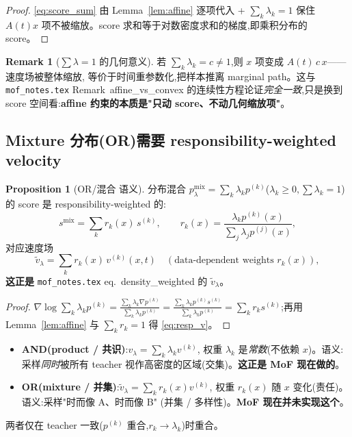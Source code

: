 \documentclass[11pt,a4paper]{article}
\newcommand{\resp}{r}
\theoremstyle{definition}
\newtheorem{remark}{Remark}
\newtheorem{proposition}{Proposition}
\begin{document}
\begin{proof}
\eqref{eq:score_sum} 由 Lemma~\ref{lem:affine} 逐项代入 + $\sum_k\lambda_k=1$
保住 $A(t)x$ 项不被缩放。score 求和等于对数密度求和的梯度,即乘积分布的 score。
\end{proof}

\begin{remark}[$\sum\lambda=1$ 的几何意义]
若 $\sum_k\lambda_k=c\neq 1$,则 $x$ 项变成 $A(t)\,c\,x$——速度场被整体缩放,
等价于时间重参数化,把样本推离 marginal path。这与 \texttt{mof\_notes.tex}
Remark~affine\_vs\_convex 的连续性方程论证\emph{完全一致},只是换到 score
空间看:\textbf{affine 约束的本质是"只动 score、不动几何缩放项"}。
\end{remark}

\subsection{Mixture 分布(OR)需要 responsibility-weighted velocity}
\label{ssec:or}

\begin{proposition}[OR/混合 语义]
\label{prop:mixture}
分布混合 $p_\lambda^{\text{mix}}=\sum_k\lambda_k p^{(k)}$($\lambda_k\ge 0,
\sum\lambda_k=1$)的 score 是 responsibility-weighted 的:
\begin{equation}
s^{\text{mix}}=\sum_k \resp_k(x)\,s^{(k)},\qquad
\resp_k(x)=\frac{\lambda_k p^{(k)}(x)}{\sum_j\lambda_j p^{(j)}(x)},
\end{equation}
对应速度场
\begin{equation}
\tilde v_\lambda=\sum_k \resp_k(x)\,v^{(k)}(x,t)
\quad(\text{data-dependent weights } \resp_k(x)),
\label{eq:resp_v}
\end{equation}
\textbf{这正是} \texttt{mof\_notes.tex} eq.~density\_weighted 的 $\tilde v_\lambda$。
\end{proposition}

\begin{proof}
$\nabla\log\sum_k\lambda_k p^{(k)}=\frac{\sum_k\lambda_k\nabla p^{(k)}}
{\sum_k\lambda_k p^{(k)}}=\frac{\sum_k\lambda_k p^{(k)}s^{(k)}}
{\sum_k\lambda_k p^{(k)}}=\sum_k \resp_k s^{(k)}$;再用 Lemma~\ref{lem:affine}
与 $\sum_k \resp_k=1$ 得 \eqref{eq:resp_v}。
\end{proof}

\begin{tcolorbox}[colback=blue!5,colframe=blue!50!black,title=\textbf{核心对照：常权 vs 责任权}]
\begin{itemize}[leftmargin=1.4em]
\item \textbf{AND(product / 共识)}:$v_\lambda=\sum_k\lambda_k v^{(k)}$,
权重 $\lambda_k$ 是\emph{常数}(不依赖 $x$)。语义:采样\emph{同时}被所有
teacher 视作高密度的区域(交集)。\textbf{这正是 MoF 现在做的}。
\item \textbf{OR(mixture / 并集)}:$\tilde v_\lambda=\sum_k \resp_k(x) v^{(k)}$,
权重 $\resp_k(x)$ 随 $x$ 变化(责任)。语义:采样"时而像 A、时而像 B"
(并集 / 多样性)。\textbf{MoF 现在并未实现这个}。
\end{itemize}
两者仅在 teacher 一致($p^{(k)}$ 重合,$\resp_k\to\lambda_k$)时重合。
\end{tcolorbox}
\end{document}
